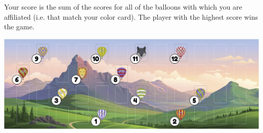 \documentclass[a6paper, 11pt, parskip=half, DIV=15]{scrartcl}
\begin{document}

Your score is the sum of the scores for all of the balloons with which you are affiliated (i.e. that match your color card). The player with the highest score wins the game.

\begin{center}
\includegraphics[scale=0.115]{scoring_diagram.jpg}
\end{center}

\newpage
\enlargethispage{1.75\baselineskip}
\end{document}
